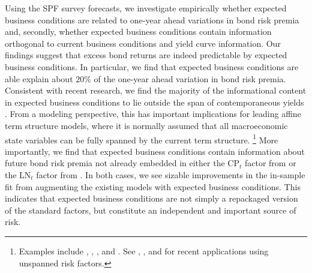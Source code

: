 \documentclass[12pt,letterpaper,leqno,doublespacing]{article}
\begin{document}
Using the SPF survey forecasts, we investigate empirically whether expected business conditions are related to one-year ahead variations in bond risk premia and, secondly, whether expected business conditions contain information orthogonal to current business conditions and yield curve information. Our findings suggest that excess bond returns are indeed predictable by expected business conditions. In particular, we find that expected business conditions are able explain about $20\%$ of the one-year ahead variation in bond risk premia. Consistent with recent research, we find the majority of the informational content in expected business conditions to lie outside the span of contemporaneous yields \citep{Duffee2011,JoslinPriebschSingleton2014}. From a modeling perspective, this has important implications for leading affine term structure models, where it is normally assumed that all macroeconomic state variables can be fully spanned by the current term structure.%
\footnote{Examples include \cite{AngPiazzesi2003}, \cite{AngDongPiazzesi2007} \cite{RudebuschWu2008}, \cite{BikbovChernov2010}, and \cite{BansalShaliastovich2013}. See \cite{AndersenBenzoni2010}, \cite{ChernovMueller2012}, and \cite{JoslinPriebschSingleton2014} for recent applications using unspanned risk factors.} 
%
More importantly, we find that expected business conditions contain information about future bond risk premia not already embedded in either the CP$_{t}$ factor from \cite{CochranePiazzesi2005} or the LN$_{t}$ factor from \cite{LudvigsonNg2009}. In both cases, we see sizable improvements in the in-sample fit from augmenting the existing models with expected business conditions. This indicates that expected business conditions are not simply a repackaged version of the standard factors, but constitute an independent and important source of risk. 
\end{document}
